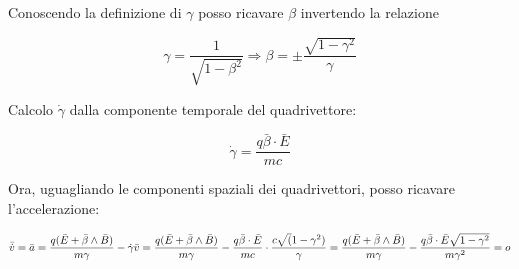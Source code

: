 \documentclass[a4paper,11pt]{book}
\begin{document}
Conoscendo la definizione di $\gamma$ posso ricavare $\beta$ invertendo la relazione

\begin{equation}
\gamma = \frac{1}{\sqrt{1-\beta^2}} \Rightarrow \beta= \pm \frac{\sqrt{1-\gamma^2}}{\gamma}
\end{equation}

Calcolo $\dot \gamma$ dalla componente temporale del quadrivettore:

\begin{equation}
\dot \gamma = \frac{q\bar \beta \cdot \bar E}{mc}
\end{equation}

Ora, uguagliando le componenti spaziali dei quadrivettori, posso ricavare l'accelerazione:

\begin{equation}
\bar{\dot v} = \bar a = \frac{q(\bar E + \bar \beta \wedge \bar B)}{m \gamma} - \dot \gamma \bar v =
\frac{q(\bar E + \bar \beta \wedge \bar B)}{m \gamma} - \frac{q \bar \beta \cdot \bar E}{mc} 
\cdot \frac{c \sqrt(1-\gamma^2)}{\gamma} = \\
\frac{q(\bar E + \bar \beta \wedge \bar B)}{m \gamma} -
\frac{q\bar \beta \cdot \bar E \sqrt{1-\gamma^2}}{m\gamma^2} =
o
\end{equation}

\end{document}
